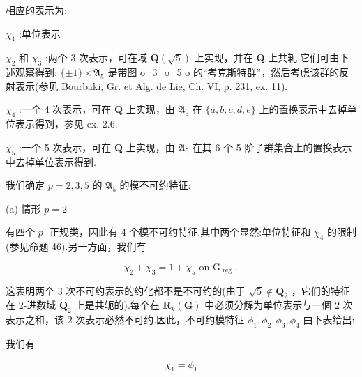 \documentclass[10pt]{article}
\begin{document}
相应的表示为:

\({\chi }_{1}\) :单位表示

\({\chi }_{2}\) 和 \({\chi }_{3}\) :两个 3 次表示，可在域 \(\mathbf{Q}\left( \sqrt{5}\right)\) 上实现，并在 \(\mathbf{Q}\) 上共轭.它们可由下述观察得到: \(\{  \pm  1\}  \times  {\mathfrak{A}}_{5}\) 是带图 o\_3\_o\_5 o 的“考克斯特群”，然后考虑该群的反射表示(参见 Bourbaki, Gr. et Alg. de Lie, Ch. VI, p. 231, ex. 11).

\({\chi }_{4}\) :一个 4 次表示，可在 \(\mathbf{Q}\) 上实现，由 \({\mathfrak{A}}_{5}\) 在 \(\{ a,b,c,d,e\}\) 上的置换表示中去掉单位表示得到，参见 ex. 2.6.

\({\chi }_{5}\) :一个 5 次表示，可在 \(\mathbf{Q}\) 上实现，由 \({\mathfrak{A}}_{5}\) 在其 6 个 5 阶子群集合上的置换表示中去掉单位表示得到.

我们确定 \(p = 2,3,5\) 的 \({\mathfrak{A}}_{5}\) 的模不可约特征:

(a) 情形 \(p = 2\)

有四个 \(p\) -正规类，因此有 4 个模不可约特征.其中两个显然:单位特征和 \({\chi }_{4}\) 的限制(参见命题 46).另一方面，我们有

\[
{\chi }_{2} + {\chi }_{3} = 1 + {\chi }_{5}\text{ on }{\mathrm{G}}_{\text{ reg }},
\]

这表明两个 3 次不可约表示的约化都不是不可约的(由于 \(\sqrt{5} \notin  {\mathbf{Q}}_{2}\) ，它们的特征在 2-进数域 \({\mathbf{Q}}_{2}\) 上是共轭的).每个在 \({\mathbf{R}}_{k}\left( \mathbf{G}\right)\) 中必须分解为单位表示与一個 2 次表示之和，该 2 次表示必然不可约.因此，不可约模特征 \({\phi }_{1},{\phi }_{2},{\phi }_{3},{\phi }_{4}\) 由下表给出:

\begin{center}
\end{center}

我们有

\[
{\chi }_{1} = {\phi }_{1}
\]
\end{document}

